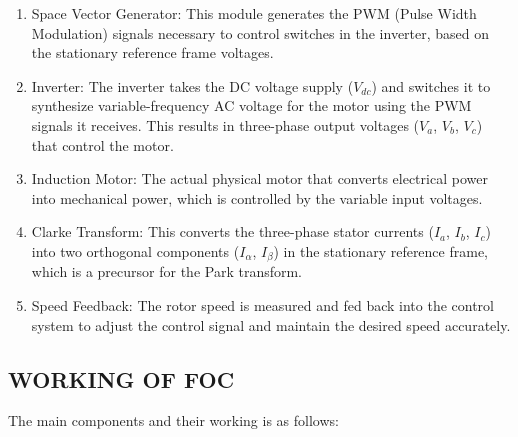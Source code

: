 \begin{enumerate}
  \item {Space Vector Generator:} This module generates the PWM (Pulse Width Modulation) signals necessary to control switches in the  
   inverter, based on the stationary reference frame voltages.
  
  \item {Inverter:} The inverter takes the DC voltage supply ($V_{dc}$) and switches it to synthesize variable-frequency AC voltage for the motor using the PWM signals it receives. This results in three-phase output voltages ($V_a$, $V_b$, $V_c$) that control the motor.
  
  \item {Induction Motor:} The actual physical motor that converts electrical power into mechanical power, which is controlled by the variable input voltages.
  
  \item {Clarke Transform:} This converts the three-phase stator currents ($I_a$, $I_b$, $I_c$) into two orthogonal components ($I_\alpha$, $I_\beta$) in the stationary reference frame, which is a precursor for the Park transform.
  
  \item {Speed Feedback:} The rotor speed is measured and fed back into the control system to adjust the control signal and maintain the desired speed accurately.
\end{enumerate}





\subsection{WORKING OF FOC}
The main components and their working is as follows:

